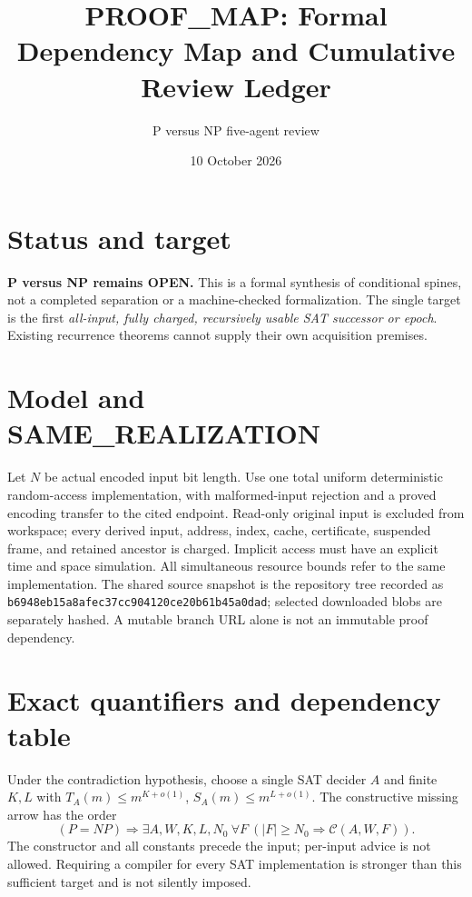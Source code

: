 \documentclass[11pt]{article}
\title{PROOF\_MAP: Formal Dependency Map and Cumulative Review Ledger}
\author{P versus NP five-agent review}
\date{10 October 2026}
\begin{document}
\maketitle

\section*{Status and target}
\textbf{P versus NP remains OPEN.} This is a formal synthesis of conditional
spines, not a completed separation or a machine-checked formalization.
The single target is the first \emph{all-input, fully charged, recursively
usable SAT successor or epoch}. Existing recurrence theorems cannot supply
their own acquisition premises.

\section*{Model and SAME\_REALIZATION}
Let $N$ be actual encoded input bit length. Use one total uniform
deterministic random-access implementation, with malformed-input rejection
and a proved encoding transfer to the cited endpoint. Read-only original
input is excluded from workspace; every derived input, address, index,
cache, certificate, suspended frame, and retained ancestor is charged.
Implicit access must have an explicit time and space simulation.
All simultaneous resource bounds refer to the same implementation.
The shared source snapshot is the repository tree recorded as
\texttt{b6948eb15a8afec37cc904120ce20b61b45a0dad}; selected downloaded blobs
are separately hashed. A mutable branch URL alone is not an immutable
proof dependency.

\section*{Exact quantifiers and dependency table}
Under the contradiction hypothesis, choose a single SAT decider $A$ and
finite $K,L$ with $T_A(m)\le m^{K+o(1)}$, $S_A(m)\le m^{L+o(1)}$.
The constructive missing arrow has the order
\[
 (P=NP)\Longrightarrow
 \exists A,W,K,L,N_0\ \forall F\ (|F|\ge N_0\Longrightarrow
       \mathcal C(A,W,F)).
\]
The constructor and all constants precede the input; per-input advice is
not allowed. Requiring a compiler for every SAT implementation is stronger
than this sufficient target and is not silently imposed.
\end{document}

